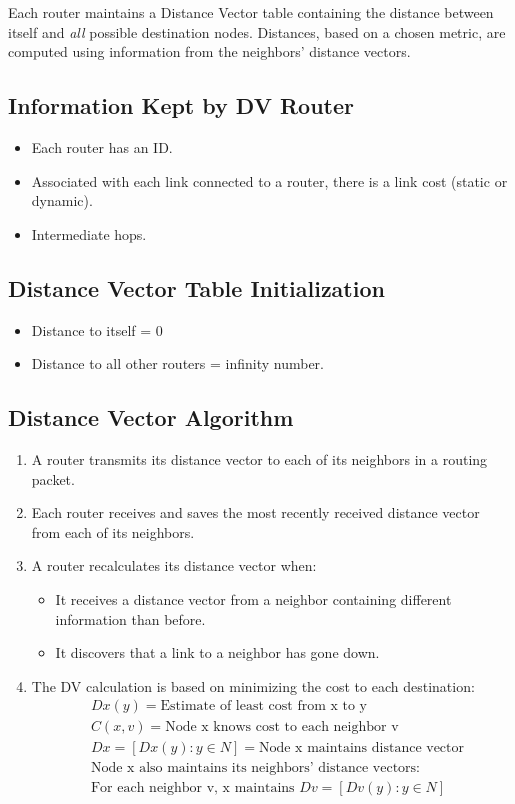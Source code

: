 \documentclass{korigamik}
\begin{document}
Each router maintains a Distance Vector table containing the distance between
itself and \textit{all} possible destination nodes. Distances, based on a
chosen metric, are computed using information from the neighbors' distance
vectors.


\subsection{Information Kept by DV Router}
\begin{itemize}
	\item Each router has an ID.
	\item Associated with each link connected to a router, there is a link cost
	      (static or dynamic).
	\item Intermediate hops.
\end{itemize}

\subsection{Distance Vector Table Initialization}
\begin{itemize}
	\item Distance to itself = 0
	\item Distance to all other routers = infinity number.
\end{itemize}

\subsection{Distance Vector Algorithm}
\begin{enumerate}
	\item A router transmits its distance vector to each of its neighbors in a
	      routing packet.
	\item Each router receives and saves the most recently received distance
	      vector from each of its neighbors.
	\item A router recalculates its distance vector when:
	      \begin{itemize}
		      \item It receives a distance vector from a neighbor containing
		            different information than before.
		      \item It discovers that a link to a neighbor has gone down.
	      \end{itemize}
	\item The DV calculation is based on minimizing the cost to each destination:
	      \begin{align*}
		       & Dx(y) = \text{Estimate of least cost from x to y}               \\
		       & C(x,v) = \text{Node x knows cost to each neighbor v}            \\
		       & Dx = [Dx(y): y \in N] = \text{Node x maintains distance vector} \\
		       & \text{Node x also maintains its neighbors' distance vectors:}   \\
		       & \text{For each neighbor v, x maintains } Dv = [Dv(y): y \in N]
	      \end{align*}
\end{enumerate}
\pagebreak
\fi
\end{document}
